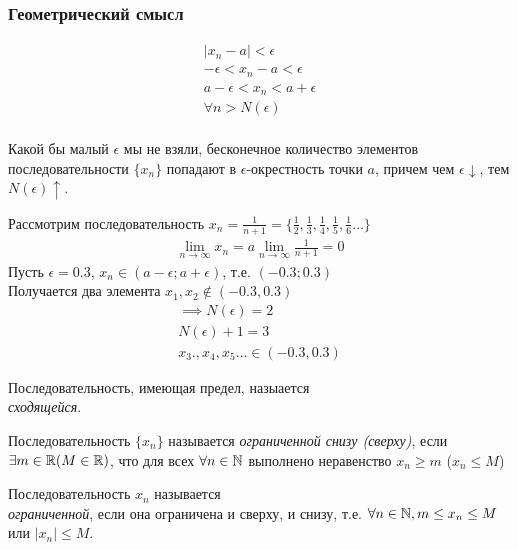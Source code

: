 \subsubsection{Геометрический смысл}
\begin{gather*}
|x_{n} - a| < \epsilon \\
- \epsilon< x_{n} - a < \epsilon \\
a - \epsilon < x_{n} < a + \epsilon \\
\forall n > N(\epsilon) \\
\end{gather*}

Какой бы малый $\epsilon$ мы не взяли, бесконечное количество элементов последовательности $\{x_{n}\}$ попадают в $\epsilon$-окрестность точки $a$, причем чем $\epsilon \downarrow$, тем  $N(\epsilon) \uparrow$.

\begin{eg}
  Рассмотрим последовательность $x_{n} = \frac{1}{n+1} = \{ \frac{1}{2}, \frac{1}{3}, \frac{1}{4}, \frac{1}{5}, \frac{1}{6}\ldots \} $
  \begin{gather*}
    \lim_{n \to \infty} x_{n} = a
    \lim_{n \to \infty} \frac{1}{n+1} = 0
  \end{gather*}
  Пусть $\epsilon = 0.3$, $x_{n}\in (a-\epsilon; a+\epsilon)$, т.е. $(-0.3; 0.3)$ \\
  Получается два элемента $x_1, x_2 \not\in (-0.3, 0.3)$
  \begin{gather*}
    \implies N(\epsilon) = 2 \\
    N(\epsilon) + 1 = 3 \\
    x_3., x_4, x_5 \ldots \in (-0.3, 0.3) 
  \end{gather*}
\end{eg}

\begin{definition}
  Последовательность, имеющая предел, назыается \\ \textit{сходящейся}.
\end{definition}

\begin{definition}
  Последовательность $\{x_{n}\} $ называется \textit{ограниченной снизу (сверху)}, если $\exists m \in \mathbb{R} (M \in \mathbb{R})$, что для всех $\forall n \in \mathbb{N}$ выполнено неравенство $x_{n} \ge m$ ($x_{n} \le M$)
\end{definition}

\begin{definition}
  Последовательность $x_{n}$ называется \\ \textit{ограниченной}, если она ограничена и сверху, и снизу, т.е. $\forall n \in \mathbb{N}, m \le x_{n} \le M$ или $|x_{n}| \le M$.
\end{definition}

